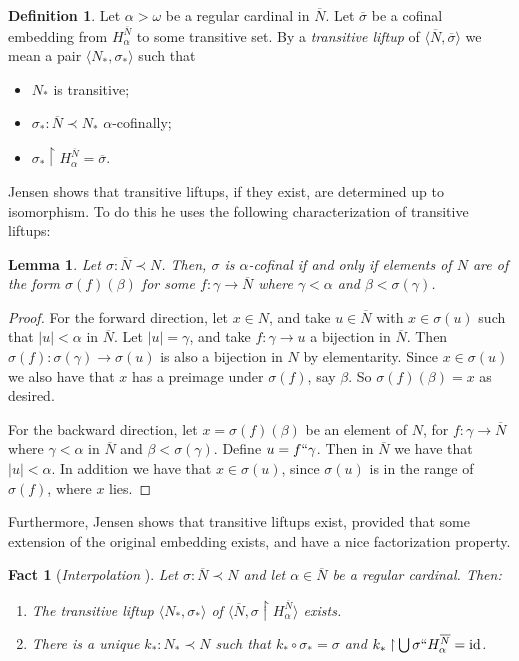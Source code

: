 \documentclass{amsart}
\newtheorem{lemma}[theorem]{Lemma}
\newtheorem{fact}[theorem]{Fact}
\theoremstyle{definition}
\newtheorem{definition}[theorem]{Definition}
\theoremstyle{remark}
\newcommand{\N}{{\overline{N}}}
\newcommand{\id}{\textup{\ensuremath{\text{id}}}}
\newcommand{\rest}{\mathbin{\upharpoonright}}
\begin{document}
\begin{definition} Let $\alpha > \omega$ be a regular cardinal in $\N$. Let 
	$\overline \sigma$ be a cofinal embedding from $H^{\N}_\alpha$ to some transitive set. By a \emph{transitive liftup} of $\langle \N, \overline \sigma \rangle$ we mean a pair $\langle N_* , \sigma_* \rangle$ such that 
\begin{itemize} 
	\item $N_*$ is transitive;
	\item $\sigma_*:\N \prec N_*$ $\alpha$-cofinally;
	\item $\sigma_* \upharpoonright H_{\alpha}^{\N}= \overline \sigma$. \qedhere
\end{itemize}	
\end{definition}

Jensen \cite[Lemma 3.1]{Jensen:2014} shows  that transitive liftups, if they exist, are determined up to isomorphism. To do this he uses the following characterization of transitive liftups:
\begin{lemma}\label{lemma:liftupchar} Let $\sigma: \N \prec N$. Then,
$\sigma$ is $\alpha$-cofinal if and only if elements of $N$ are of the form $\sigma(f)(\beta)$ for some $f: \gamma \to \overline N$ where $\gamma < \alpha$ and $\beta < \sigma(\gamma)$. \end{lemma} 
\begin{proof} 
For the forward direction, let $x \in N$, and take $u \in \overline N$ with $x \in \sigma(u)$ such that $|u| <\alpha$ in $\overline N$. Let $|u|=\gamma$, and take $f:\gamma \to u$ a bijection in $\overline N$. Then $\sigma(f):\sigma(\gamma) \to \sigma(u)$ is also a bijection in $N$ by elementarity. Since $x \in \sigma(u)$ we also have that $x$ has a preimage under $\sigma(f)$, say $\beta$. So $\sigma(f)(\beta)=x$ as desired.

For the backward direction, let $x=\sigma(f)(\beta)$ be an element of $N$, for $f:\gamma \to \overline N$ where $\gamma < \alpha$ in $\overline N$ and $\beta < \sigma(\gamma)$. Define $u = f``\gamma$. Then in $\overline N$ we have that $|u|<\alpha$. In addition we have that $x \in \sigma(u)$, since $\sigma(u)$ is in the range of $\sigma(f)$, where $x$ lies.
\end{proof}

Furthermore, Jensen shows that transitive liftups exist, provided that some extension of the original embedding exists, and have a nice factorization property.

\begin{fact}[\emph{Interpolation} {\cite[Lemma 5.1]{Jensen:2014}}]\label{fact:Interpolation} Let $\sigma:\N \prec N$ and let $\alpha \in \N$ be a regular cardinal. Then: \begin{enumerate}
	\item The transitive liftup $\langle N_*, \sigma_* \rangle$ of $\langle \N, \sigma \rest H^{\N}_\alpha \rangle$ exists.
	\item There is a unique $k_*:N_* \prec N$ such that $k_* \circ \sigma_* = \sigma$ and $k_* \rest \bigcup \sigma `` H^{\N}_\alpha = \id$.
\end{enumerate}
\end{fact} 
\end{document}

